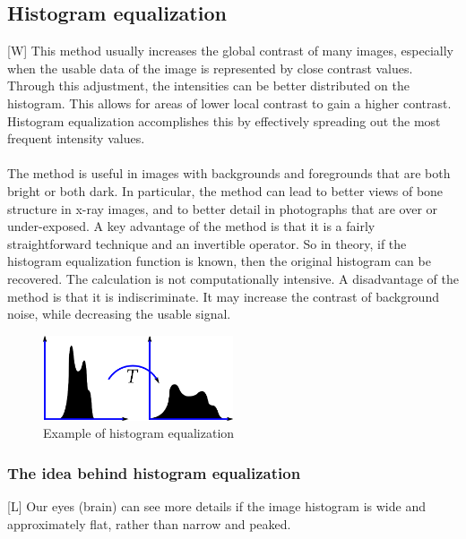 \documentclass[12pt]{article}
\begin{document}
	\subsection{Histogram equalization}
	[W] This method usually increases the global contrast of many images, especially when the usable data
	 of the image is represented by close contrast values. Through this adjustment, the intensities 
	 can be better distributed on the histogram. This allows for areas of lower local contrast to gain 
	 a higher contrast. Histogram equalization accomplishes this by effectively spreading out the most 
	 frequent intensity values.\\
	 \\
	The method is useful in images with backgrounds and foregrounds that are both bright or both dark. 
	In particular, the method can lead to better views of bone structure in x-ray images, and to 
	better detail in photographs that are over or under-exposed. A key advantage of the method is that 
	it is a fairly straightforward technique and an invertible operator. So in theory, if the 
	histogram equalization function is known, then the original histogram can be recovered. The 
	calculation is not computationally intensive. A disadvantage of the method is that it is 
	indiscriminate. It may increase the contrast of background noise, while decreasing the usable 
	signal.
	\begin{figure}[h!]
		\centering
		\includegraphics[width=0.5\textwidth]{img/histogram_equalization.png}
		\caption{Example of histogram equalization}		
		\label{fig:histeq}
	\end{figure}
		\subsubsection{The idea behind histogram equalization}
	[L] Our eyes (brain) can see more details if the image histogram is wide and approximately
	flat, rather than narrow and peaked.
	
\end{document}
